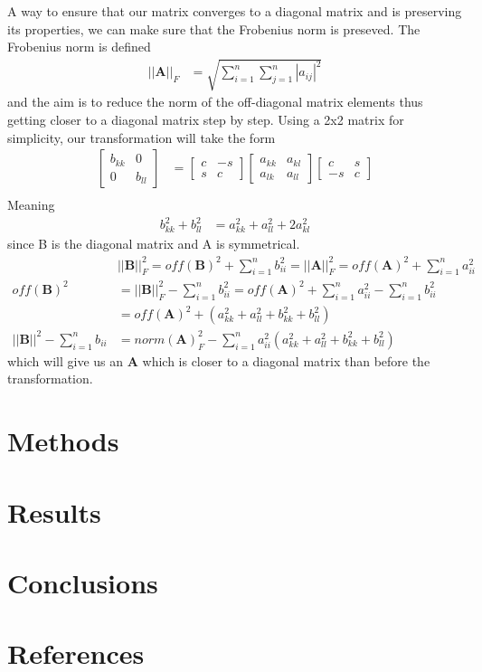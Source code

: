 \documentclass[12pt]{article}
\begin{document}
A way to ensure that our matrix converges to a diagonal matrix and is preserving its properties, we can make sure that the Frobenius norm is preseved. The Frobenius norm is defined
\begin{align*}
    \left|\left|\textbf{A}\right|\right|_F &= \sqrt{\sum_{i=1}^n\sum_{j=1}^n|a_{ij}|^2}
\end{align*}
and the aim is to reduce the norm of the off-diagonal matrix elements thus getting closer to a diagonal matrix step by step. Using a 2x2 matrix for simplicity, our transformation will take the form
\begin{align*}
    \begin{bmatrix}
        b_{kk} & 0\\
        0 & b_{ll}
    \end{bmatrix}&=
    \begin{bmatrix}
        c & -s\\
        s & c
    \end{bmatrix}
    \begin{bmatrix}
        a_{kk} & a_{kl}\\
        a_{lk} & a_{ll}
    \end{bmatrix}
    \begin{bmatrix}
        c & s\\
        -s & c
    \end{bmatrix}\\
\end{align*}
Meaning
\begin{align*}
    b_{kk}^2+b_{ll}^2 &= a_{kk}^2+a_{ll}^2+2a_{kl}^2
\end{align*}
since B is the diagonal matrix and A is symmetrical.
\begin{align*}
    &\boxed{||\textbf{B}||_F^2 = off(\textbf{B})^2+\sum_{i=1}^nb_{ii}^2 =||\textbf{A}||_F^2 = off(\textbf{A})^2+\sum_{i=1}^na_{ii}^2}\\
    off(\textbf{B})^2 &= ||\textbf{B}||_F^2 -\sum_{i=1}^nb_{ii}^2
    = off(\textbf{A})^2 + \sum_{i=1}^na_{ii}^2 -\sum_{i=1}^nb_{ii}^2\\
    &= off(\textbf{A})^2+\left(a_{kk}^2+a_{ll}^2+b_{kk}^2+b_{ll}^2\right)\\
    ||\textbf{B}||^2-\sum_{i=1}^nb_{ii} &= norm(\textbf{A})_F^2-\sum_{i=1}^na_{ii}^2\left(a_{kk}^2+a_{ll}^2+b_{kk}^2+b_{ll}^2\right)
\end{align*}
which will give us an $\textbf{A}$ which is closer to a diagonal matrix than before the transformation.



\section*{Methods}

\section*{Results}

\section*{Conclusions}

\section*{References}
\end{document}
